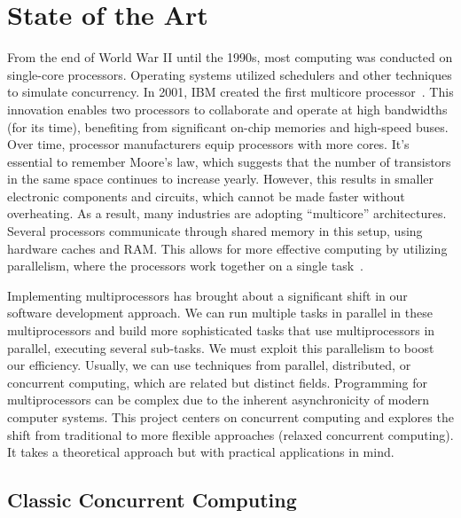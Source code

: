 \chapter{\label{chapter:2_State_of_art}State of the Art}

From the end of World War II until the 1990s, most computing was conducted on single-core processors. Operating systems utilized schedulers and other techniques to simulate concurrency. In 2001, IBM created the first multicore processor~\cite{ibmIBM100Power}. This innovation enables two processors to collaborate and operate at high bandwidths (for its time), benefiting from significant on-chip memories and high-speed buses. Over time, processor manufacturers equip processors with more cores. It's essential to remember Moore's law, which suggests that the number of transistors in the same space continues to increase yearly. However, this results in smaller electronic components and circuits, which cannot be made faster without overheating. As a result, many industries are adopting ``multicore'' architectures. Several processors communicate through shared memory in this setup, using hardware caches and RAM. This allows for more effective computing by utilizing parallelism, where the processors work together on a single task~\cite{DBLP_books_daglib_0020056}.

Implementing multiprocessors has brought about a significant shift in our software development approach. We can run multiple tasks in parallel in these multiprocessors and build more sophisticated tasks that use multiprocessors in parallel, executing several sub-tasks. We must exploit this parallelism to boost our efficiency. Usually, we can use techniques from parallel, distributed, or concurrent computing, which are related but distinct fields. Programming for multiprocessors can be complex due to the inherent asynchronicity of modern computer systems. This project centers on concurrent computing and explores the shift from traditional to more flexible approaches (relaxed concurrent computing). It takes a theoretical approach but with practical applications in mind.

\section{\label{section:classic-concurrent}Classic Concurrent Computing}

